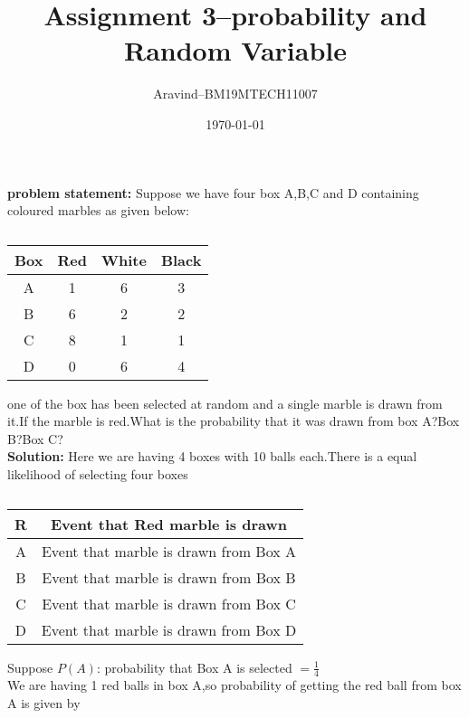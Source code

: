 \documentclass[11pt,a4paper,twocolumn]{article}
\title{\textbf{Assignment 3--probability and Random Variable}}
\author{Aravind--BM19MTECH11007}
\date{\today}
\begin{document}
\maketitle
\textbf{problem statement:} Suppose we have four box A,B,C and D containing coloured marbles as given below:
\begin{table}[h]
\centering
\caption{}

\begin{tabular}{|c|c|c|c|}
\hline
Box & Red & White & Black\\
\hline
A & 1&6&3\\
B&6&2&2\\
C&8&1&1\\
D&0&6&4\\
\hline
\end{tabular}
\end{table}
one of the box has been selected at random and a single marble is drawn from it.If the marble is red.What is the probability that it was drawn from box A?Box B?Box C?
\\
\textbf{Solution:}
Here we are having 4 boxes with 10 balls each.There is a equal likelihood of selecting  four boxes
\\
\begin{table}[h]
\centering
\caption{}
\begin{tabular}{|c|c|}
\hline
R&Event that Red marble is drawn\\
\hline
A&Event that marble is drawn from Box A\\
\hline
B&Event that marble is drawn from Box B\\
\hline
C&Event that marble is drawn from Box C\\
\hline
D&Event that marble is drawn from Box D\\
\hline
\end{tabular}
\end{table}
Suppose
$P(A)$: probability that  Box A is selected  $=\frac{1}{
4}$
\\We are having 1 red balls in box A,so probability of getting the red ball from box A is given by
\end{document}
